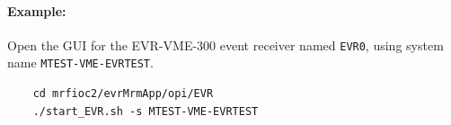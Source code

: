 \documentclass[12pt,a4paper]{article}
\begin{document}
\paragraph{Example:} Open the GUI for the EVR-VME-300 event receiver named \texttt{EVR0}, using system name \texttt{MTEST-VME-EVRTEST}.
\begin{verbatim}
	cd mrfioc2/evrMrmApp/opi/EVR
	./start_EVR.sh -s MTEST-VME-EVRTEST
\end{verbatim}




\end{document}
